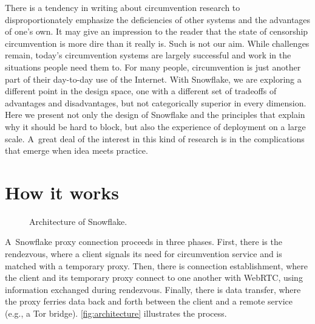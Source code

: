 \documentclass[letterpaper,twocolumn]{article}
\begin{document}

There is a tendency in writing about
circumvention research to disproportionately emphasize
the deficiencies of other systems
and the advantages of one's own.
It may give an impression to the reader
that the state of censorship circumvention
is more dire than it really is.
Such is not our aim.
While challenges remain,
today's circumvention systems are largely successful
and work in the situations people need them to.
For many people, circumvention is just another part of their
day-to-day use of the Internet.
With Snowflake, we are exploring a different point in the design space,
one with a different set of tradeoffs of advantages and disadvantages,
but not categorically superior in every dimension.
Here we present not only the design of Snowflake
and the principles that explain why it should be hard to block,
but also the experience of deployment on a large scale.
A~great deal of the interest in this kind of research
is in the complications that emerge when idea meets practice.


\section{How it works}
\label{sec:mechanics}

\begin{figure}[t]
\caption{
Architecture of Snowflake.
}
\label{fig:architecture}
\end{figure}

A~Snowflake proxy connection proceeds in three phases.
First, there is the rendezvous, where a client
signals its need for circumvention service
and is matched with a temporary proxy.
Then, there is connection establishment,
where the client and its temporary proxy connect to one another
with WebRTC, using information exchanged during rendezvous.
Finally, there is data transfer,
where the proxy ferries data back and forth
between the client and a remote service
(e.g., a Tor bridge).
\autoref{fig:architecture}
illustrates the process.
\end{document}
